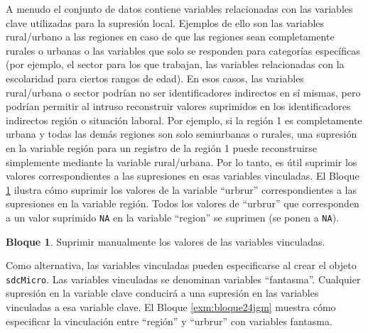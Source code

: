 \documentclass[
]{book}
\newenvironment{Shaded}{\begin{snugshade}}{\end{snugshade}}
\newcommand{\CommentTok}[1]{\textcolor[rgb]{0.56,0.35,0.01}{\textit{#1}}}
\newcommand{\ConstantTok}[1]{\textcolor[rgb]{0.00,0.00,0.00}{#1}}
\newcommand{\FunctionTok}[1]{\textcolor[rgb]{0.00,0.00,0.00}{#1}}
\newcommand{\NormalTok}[1]{#1}
\newcommand{\OtherTok}[1]{\textcolor[rgb]{0.56,0.35,0.01}{#1}}
\newcommand{\SpecialCharTok}[1]{\textcolor[rgb]{0.00,0.00,0.00}{#1}}
\newcommand{\StringTok}[1]{\textcolor[rgb]{0.31,0.60,0.02}{#1}}
\theoremstyle{definition}
\theoremstyle{definition}
\newtheorem{example}{Bloque}[chapter]
\theoremstyle{definition}
\theoremstyle{definition}
\theoremstyle{remark}
\begin{document}
A menudo el conjunto de datos contiene variables relacionadas con las variables clave utilizadas para la supresión local. Ejemplos de ello son las variables rural/urbano a las regiones en caso de que las regiones sean completamente rurales o urbanas o las variables que solo se responden para categorías específicas (por ejemplo, el sector para los que trabajan, las variables relacionadas con la escolaridad para ciertos rangos de edad). En esos casos, las variables rural/urbana o sector podrían no ser identificadores indirectos en sí mismas, pero podrían permitir al intruso reconstruir valores suprimidos en los identificadores indirectos región o situación laboral. Por ejemplo, si la región 1 es completamente urbana y todas las demás regiones son solo semiurbanas o rurales, una supresión en la variable región para un registro de la región 1 puede reconstruirse simplemente mediante la variable rural/urbana. Por lo tanto, es útil suprimir los valores correspondientes a las supresiones en esas variables vinculadas. El Bloque \ref{exm:bloque23jgm} ilustra cómo suprimir los valores de la variable ``urbrur'' correspondientes a las supresiones en la variable región. Todos los valores de ``urbrur'' que corresponden a un valor suprimido \texttt{NA} en la variable ``region'' se suprimen (se ponen a \texttt{NA}).

\begin{example}
\protect\hypertarget{exm:bloque23jgm}{}\label{exm:bloque23jgm}Suprimir manualmente los valores de las variables vinculadas.
\end{example}

\begin{Shaded}
\end{Shaded}

Como alternativa, las variables vinculadas pueden especificarse al crear el objeto \texttt{sdcMicro}. Las variables vinculadas se denominan variables ``fantasma''. Cualquier supresión en la variable clave conducirá a una supresión en las variables vinculadas a esa variable clave. El Bloque \ref{exm:bloque24jgm} muestra cómo especificar la vinculación entre ``región'' y ``urbrur'' con variables fantasma.
\end{document}
